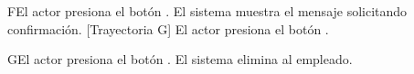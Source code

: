 \begin{UCtrayectoriaA}{F}{El actor presiona el botón .}
    \UCpaso El sistema muestra el mensaje  solicitando confirmación. [Trayectoria G]
    \UCpaso[\UCactor] El actor presiona el botón .
\end{UCtrayectoriaA}

\begin{UCtrayectoriaA}{G}{El actor presiona el botón .}
    \UCpaso     El sistema elimina al empleado.  
\end{UCtrayectoriaA}
